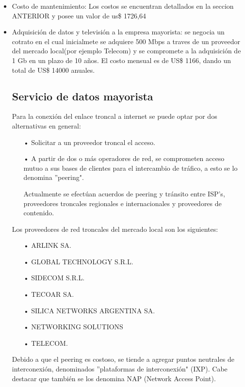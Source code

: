 \begin{itemize}
\item Costo de mantenimiento: Los costos se encuentran detallados en la seccion ANTERIOR y posee un valor de us\$ 1726,64

\item Adquisición de datos y televisión a la empresa mayorista: se negocia un cotrato en el cual inicialmete se adquiere 500 Mbps a traves de un proveedor del mercado local(por ejemplo Telecom) y se compromete a la adquisición de  1 Gb en un plazo de 10 años. El costo mensual es de US\$ 1166, dando un total de US\$ 14000 anuales.

\subsection{Servicio de datos mayorista}
Para la conexión del enlace troncal a internet se puede optar por dos alternativas
en general:
\begin{enumerate}
\item[•]Solicitar a un proveedor troncal el acceso.
\item[•]A partir de dos o más operadores de red, se comprometen acceso mutuo a sus
bases de clientes para el intercambio de tráfico, a esto se lo denomina ''peering".

Actualmente se efectúan acuerdos de peering y tránsito entre ISP's, proveedores
troncales regionales e internacionales y proveedores de contenido.
\end{enumerate}

Los proveedores de red troncales del mercado local son los siguientes:
\begin{enumerate}
\item[•]ARLINK SA.
\item[•]GLOBAL TECHNOLOGY S.R.L.
\item[•]SIDECOM S.R.L.
\item[•]TECOAR SA.
\item[•]SILICA NETWORKS ARGENTINA SA.
\item[•]NETWORKING SOLUTIONS
\item[•]TELECOM.
\end{enumerate}



Debido a que el peering es costoso, se tiende a agregar puntos
neutrales de interconexión, denominados ''plataformas de interconexión" (IXP).
Cabe destacar que también se los denomina NAP (Network Access Point).


\end{itemize}
